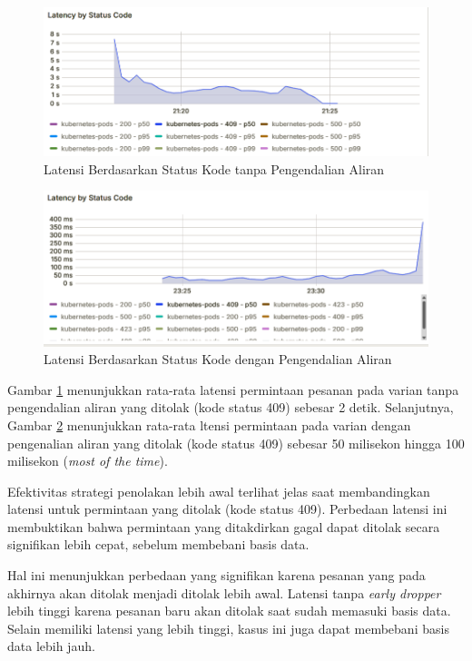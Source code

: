 \begin{figure}[H]
    \centering
    \includegraphics[width=1\textwidth]{resources/chapter-4/latency-by-code-nofc-pg-stress-0.png}
    \caption{Latensi Berdasarkan Status Kode tanpa Pengendalian Aliran}
    \label{fig:latency-by-code-nofc}
\end{figure}

\begin{figure}[H]
    \centering
    \includegraphics[width=1\textwidth]{resources/chapter-4/latency-by-code-fc-pg-stress-0.png}
    \caption{Latensi Berdasarkan Status Kode dengan Pengendalian Aliran}
    \label{fig:latency-by-code-fc}
\end{figure}

Gambar \ref{fig:latency-by-code-nofc} menunjukkan rata-rata latensi permintaan pesanan pada varian tanpa pengendalian aliran yang ditolak (kode status 409) sebesar 2 detik. Selanjutnya, Gambar \ref{fig:latency-by-code-fc} menunjukkan rata-rata ltensi permintaan pada varian dengan pengenalian aliran yang ditolak (kode status 409) sebesar 50 milisekon hingga 100 milisekon (\textit{most of the time}).

Efektivitas strategi penolakan lebih awal terlihat jelas saat membandingkan latensi untuk permintaan yang ditolak (kode status 409). Perbedaan latensi ini membuktikan bahwa permintaan yang ditakdirkan gagal dapat ditolak secara signifikan lebih cepat, sebelum membebani basis data.

Hal ini menunjukkan perbedaan yang signifikan karena pesanan yang pada akhirnya akan ditolak menjadi ditolak lebih awal. Latensi tanpa \textit{early dropper} lebih tinggi karena pesanan baru akan ditolak saat sudah memasuki basis data. Selain memiliki latensi yang lebih tinggi, kasus ini juga dapat membebani basis data lebih jauh.

